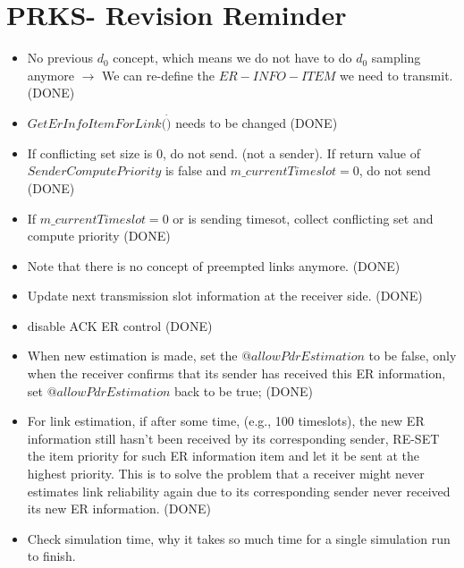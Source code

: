 \section {PRKS- Revision Reminder}
\begin{itemize}
  \item No previous $d_0$ concept, which means we do not have to do $d_0$ sampling anymore $\rightarrow$ We can re-define the $ER-INFO-ITEM$ we need to transmit.(DONE)
  \item $GetErInfoItemForLink (\dot)$ needs to be changed (DONE)
  \item If conflicting set size is 0, do not send. (not a sender). If return value of $SenderComputePriority$ is false and $m\_currentTimeslot = 0$, do not send (DONE)
  \item If $m\_currentTimeslot = 0$ or is sending timesot, collect conflicting set and compute priority (DONE)
  \item Note that there is no concept of preempted links anymore. (DONE)
  \item Update next transmission slot information at the receiver side. (DONE)
  \item disable ACK ER control (DONE)
  \item When new estimation is made, set the $@allowPdrEstimation$ to be false, only when the receiver confirms that its sender has received this ER information, set $@allowPdrEstimation$ back to be true; (DONE)
  \item For link estimation, if after some time, (e.g., 100 timeslots), the new ER information still hasn't been received by its corresponding sender, RE-SET the item priority for such ER information item and let it be sent at the highest priority. This is to solve the problem that a receiver might never estimates link reliability again due to its corresponding sender never received its new ER information. (DONE)
  \item Check simulation time, why it takes so much time for a single simulation run to finish.
\end{itemize}
